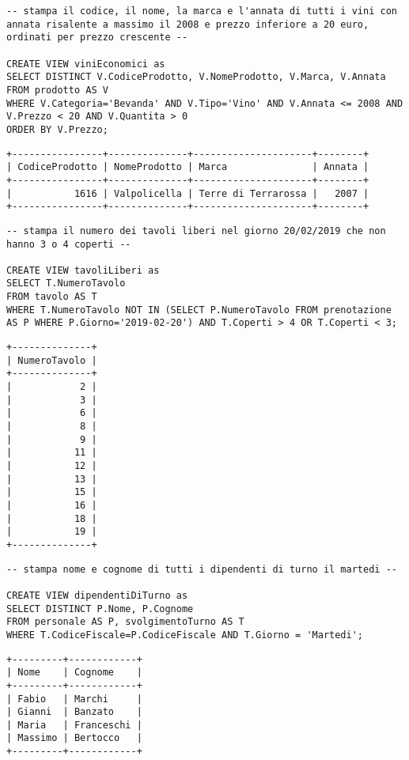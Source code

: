 \begin{lstlisting}[title=Operazione 8, style=mysqlStyle]
-- stampa il codice, il nome, la marca e l'annata di tutti i vini con annata risalente a massimo il 2008 e prezzo inferiore a 20 euro, ordinati per prezzo crescente --

CREATE VIEW viniEconomici as
SELECT DISTINCT V.CodiceProdotto, V.NomeProdotto, V.Marca, V.Annata
FROM prodotto AS V
WHERE V.Categoria='Bevanda' AND V.Tipo='Vino' AND V.Annata <= 2008 AND V.Prezzo < 20 AND V.Quantita > 0
ORDER BY V.Prezzo;
\end{lstlisting}
\begin{lstlisting}[basicstyle=\ttfamily\footnotesize]
+----------------+--------------+---------------------+--------+  
| CodiceProdotto | NomeProdotto | Marca               | Annata |  
+----------------+--------------+---------------------+--------+  
|           1616 | Valpolicella | Terre di Terrarossa |   2007 |  
+----------------+--------------+---------------------+--------+  
\end{lstlisting}
\begin{lstlisting}[title=Operazione 9, style=mysqlStyle]
-- stampa il numero dei tavoli liberi nel giorno 20/02/2019 che non hanno 3 o 4 coperti --

CREATE VIEW tavoliLiberi as
SELECT T.NumeroTavolo
FROM tavolo AS T
WHERE T.NumeroTavolo NOT IN (SELECT P.NumeroTavolo FROM prenotazione AS P WHERE P.Giorno='2019-02-20') AND T.Coperti > 4 OR T.Coperti < 3;
\end{lstlisting}
\begin{lstlisting}[basicstyle=\ttfamily\footnotesize]
+--------------+  
| NumeroTavolo |  
+--------------+  
|            2 |  
|            3 |  
|            6 |  
|            8 |  
|            9 |  
|           11 |  
|           12 |  
|           13 |  
|           15 |  
|           16 |  
|           18 |  
|           19 |  
+--------------+  
\end{lstlisting}
\begin{lstlisting}[title=Operazione 10, style=mysqlStyle]
-- stampa nome e cognome di tutti i dipendenti di turno il martedi --

CREATE VIEW dipendentiDiTurno as
SELECT DISTINCT P.Nome, P.Cognome
FROM personale AS P, svolgimentoTurno AS T
WHERE T.CodiceFiscale=P.CodiceFiscale AND T.Giorno = 'Martedi';
\end{lstlisting}
\begin{lstlisting}[basicstyle=\ttfamily\footnotesize]
+---------+------------+  
| Nome    | Cognome    |  
+---------+------------+  
| Fabio   | Marchi     |  
| Gianni  | Banzato    |  
| Maria   | Franceschi |  
| Massimo | Bertocco   |  
+---------+------------+  
\end{lstlisting}

